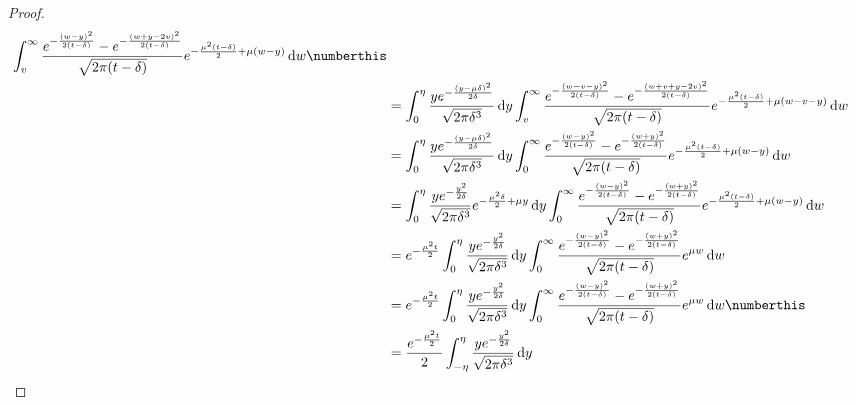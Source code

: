 \begin{proof}
\begin{align*}
	\int_{v }^{\infty} 
	\frac{
		e^{  - \frac{(w-y)^2}{2 ( t - \delta) } } - e^{-  \frac{(w + y - 2v)^2}{2(t - \delta)}  }
	}{\sqrt{ 2 \pi ( t- \delta)}} e^{  - \frac{\mu^2 ( t - \delta)}{2} + \mu ( w - y)  } \, \mathrm d w
	\numberthis \label{eq:lemma-prob-eps}
	\\
	&=
	\int_{0}^\eta 
	\frac{
		y e^{    -   \frac{(y-\mu \delta )^2}{2 \delta} }
	}{\sqrt{2 \pi \delta ^ 3}} \,\mathrm d y 
	\int_{ v }^\infty 
	\frac{
		e^{ - \frac{(w - v - y)^2}{2 ( t - \delta)} } 
		- 
		e^{  - \frac{ ( w + v + y - 2 v )^2   }  { 2 (t-\delta)   } }
	}{\sqrt{2 \pi (t - \delta)}} 
	e^{  - \frac{\mu^2 ( t - \delta)}{2} + \mu ( w -v  - y)  } \, \mathrm d w
	\\
	&=
	\int_{0}^\eta 
	\frac{
		y e^{    -   \frac{(y-\mu \delta )^2}{2 \delta} }
	}{\sqrt{2 \pi \delta ^ 3}} \,\mathrm d y 
	\int_{0} ^ \infty 
	\frac{
		e^{ - \frac{(w - y)^2}{2 ( t - \delta)} } 
		- 
		e^{  - \frac{ ( w +  y   )^2   }  { 2 (t-\delta)   } }
	}{\sqrt{2 \pi (t - \delta)}} 
	e^{  - \frac{\mu^2 ( t - \delta)}{2} + \mu ( w - y)  } \, \mathrm d w
	\\
	&=
	\int_{0}^\eta 
	\frac{
		y e^{    -   \frac{y^2}{2 \delta} }
	}{\sqrt{2 \pi \delta ^ 3}} 
	e^{  - \frac{\mu^2  \delta}{2} + \mu y  }
	\,\mathrm d y 
	\int_{0} ^ \infty 
	\frac{
		e^{ - \frac{(w - y)^2}{2 ( t - \delta)} } 
		- 
		e^{  - \frac{ ( w +  y   )^2   }  { 2 (t-\delta)   } }
	}{\sqrt{2 \pi (t - \delta)}} 
	e^{  - \frac{\mu^2 ( t - \delta)}{2} + \mu ( w - y)  } \, \mathrm d w
	\\
	&=
	e^{  - \frac{\mu^2  t}{2}  }
	\int_{0}^\eta 
	\frac{
		y e^{    -   \frac{y^2}{2 \delta} }
	}{\sqrt{2 \pi \delta ^ 3}} 
	\,\mathrm d y 
	\int_{0} ^ \infty 
	\frac{
		e^{ - \frac{(w - y)^2}{2 ( t - \delta)} } 
		- 
		e^{  - \frac{ ( w +  y   )^2   }  { 2 (t-\delta)   } }
	}{\sqrt{2 \pi (t - \delta)}} 
	e^{   \mu w  } \, \mathrm d w \,\, 
	\\
	&=
	e^{ - \frac{\mu^2 t}{2}} 
	\int_0^\eta \frac{ y e^{ - \frac{ y^2}{2 \delta }}}{\sqrt{2 \pi \delta^3}} \, \mathrm d y
	\int_0^\infty 
	\frac{ e^{- \frac{ ( w - y)^2}{2(t-\delta )}} 
		- e^{   - \frac{ (w+y)^2}{2 ( t-\delta)}   } } {\sqrt{2 \pi (t - \delta)}}
	e^{ \mu w } \, \mathrm d w
	\numberthis \label{eq:lemma-prob-even}
	\\
	&=
	\frac{ 
		e^{ - \frac{\mu^2 t}{2}}
	}{2} 
	\int_{- \eta} ^ \eta 
	\frac{ y e^{ - \frac{ y^2}{2 \delta }}}{\sqrt{2 \pi \delta^3}} \, \mathrm d y

\end{align*}
\end{proof}
